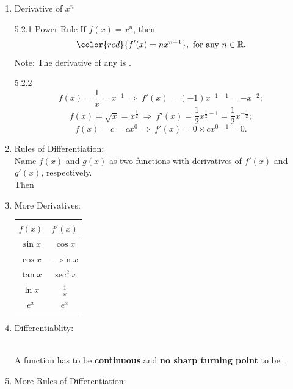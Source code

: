 \documentclass[12pt, a4paper]{article}
\begin{document}
\begin{enumerate}
\begin{itemize}
\begin{example}{5.2.1}{}
$$\begin{aligned}
            &=2x.
        \end{aligned}$$
        At $x=3$, $f'(3)=2\times 3=6.$ The gradient is $6.$
    \end{example}
    \end{itemize}
    \item Derivative of $x^n$
    \begin{theorem}{5.2.1 Power Rule}{}
        If $f(x)=x^n$, then 
        $${\color{red}{f'(x)=nx^{n-1}}},\ \text{for any } n \in \mathbb{R}.$$
        Note: The derivative of any {\color{red}{constant}} is {\color{red}{0}}.
    \end{theorem}
    \begin{example}{5.2.2}{}
        $$f(x)=\frac{1}{x}=x^{-1}\ \Rightarrow\ f'(x)=(-1)x^{-1-1}=-x^{-2};$$
        $$f(x)=\sqrt{x}=x^{\frac{1}{2}}\ \Rightarrow\ f'(x)=\frac{1}{2}x^{\frac{1}{2}-1}=\frac{1}{2}x^{-\frac{1}{2}};$$
        $$f(x)=c=cx^0\ \Rightarrow\ f'(x)=0\times cx^{0-1}=0.$$
    \end{example}
    \item Rules of Differentiation: \\
    Name $f(x)$ and $g(x)$ as two functions with derivatives of $f'(x)$ and $g'(x)$, respectively.\\
    Then {\color{red}{$$\left(cf(x)\right)'=cf'(x)$$
    $$\left(f(x)\pm g(x)\right)'=f'(x)\pm g'(x)$$}}
    \item More Derivatives: 
    \begin{center}\begin{tabular}{c|c}
        $f(x)$&$f'(x)$\\ \hline
        $\sin x$&$\cos x$\\ 
        $\cos x$&$-\sin x$\\ 
        $\tan x$&$\sec^2x$\\
        $\ln x$&$\frac{1}{x}$\\
        $e^x$&$e^x$
    \end{tabular}\end{center}
    \item Differentiablity: 
    \begin{myclaim}{ }{}
        \\
        A function has to be \textbf{continuous} and \textbf{no sharp turning point} to be \textbf{\color{red}{differentiable}}.\\
        {\color{green}{Note: Smooth turning point on the graph is allowed.}}
    \end{myclaim}
    \item More Rules of Differentiation: 

\end{enumerate}
\end{document}
